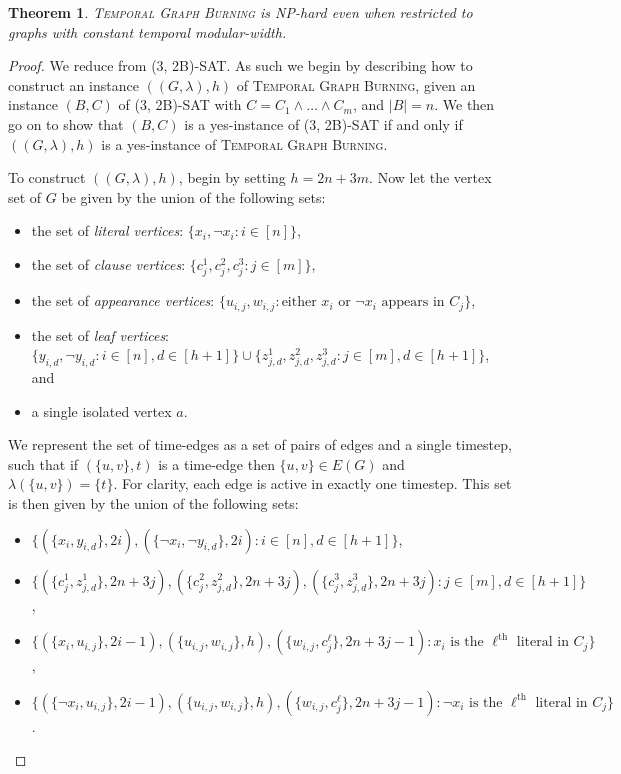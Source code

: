 \documentclass[preprint,12pt]{elsarticle}
\newtheorem{theorem}{Theorem}
\begin{document}
\begin{theorem}
\textsc{Temporal Graph Burning} is NP-hard even when restricted to graphs with constant temporal modular-width.
\end{theorem}
\begin{proof}
    We reduce from \textsc{(3, 2B)-SAT}. As such we begin by describing how to construct an instance $((G, \lambda), h)$ of \textsc{Temporal Graph Burning}, given an instance $(B, C)$ of \textsc{(3, 2B)-SAT} with $C=C_1 \land \dots \land C_m$, and $|B|=n$. We then go on to show that $(B, C)$ is a yes-instance of \textsc{(3, 2B)-SAT} if and only if $((G, \lambda), h)$ is a yes-instance of \textsc{Temporal Graph Burning}.

    To construct $((G, \lambda), h)$, begin by setting $h=2n+3m$. Now let the vertex set of $G$ be given by the union of the following sets:
    \begin{itemize}
        \item the set of \textit{literal vertices}: $\{x_i, \neg x_i: i \in [n]\}$,
        \item the set of \textit{clause vertices}: $\{c_j^1,c_j^2,c_j^3: j \in [m]\}$,
        \item the set of \textit{appearance vertices}: $\{u_{i,j},w_{i,j}: \text{either } x_i \text{ or } \neg x_i \text{ appears in } C_j\}$,
        \item the set of \textit{leaf vertices}: $\{ y_{i,d}, \lnot y_{i,d}: i \in [n], d \in [h+1] \} \cup \{ z_{j,d}^1, z_{j,d}^2, z_{j,d}^3: j \in [m], d \in [h+1] \}$, and
        \item a single isolated vertex $a$.
    \end{itemize}

    We represent the set of time-edges as a set of pairs of edges and a single timestep, such that if $(\{u,v\},t)$ is a time-edge then $\{u,v\}\in E(G)$ and $\lambda(\{u,v\})=\{t\}$. For clarity, each edge is active in exactly one timestep. This set is then given by the union of the following sets:

    \begin{itemize}
        \item $\{ (\{x_i,y_{i,d}\}, 2i), (\{\lnot x_i,\lnot y_{i,d}\}, 2i): i \in [n], d \in [h+1] \}$,
        \item $\{ (\{c_j^1,z_{j,d}^1\}, 2n+3j), (\{c_j^2,z_{j,d}^2\}, 2n+3j), (\{c_j^3,z_{j,d}^3\}, 2n+3j): j \in [m], d \in [h+1] \}$,
        \item $\{ (\{x_i,u_{i,j}\}, 2i-1), (\{u_{i,j},w_{i,j}\}, h), (\{w_{i,j},c_j^\ell\}, 2n+3j-1): x_i\text{ is the }\ell^\text{th}\text{ literal in }C_j \}$,
        \item $\{ (\{\lnot x_i,u_{i,j}\}, 2i-1), (\{u_{i,j},w_{i,j}\}, h), (\{w_{i,j},c_j^\ell\}, 2n+3j-1): \lnot x_i\text{ is the }\ell^\text{th}\text{ literal in }C_j \}$.
    \end{itemize}


\end{proof}
\end{document}
